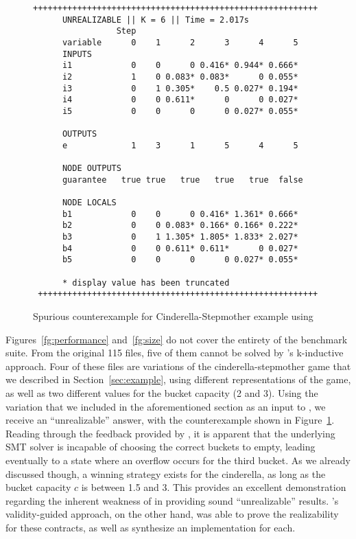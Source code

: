 \begin{figure}[h]
\centering
 \begin{Verbatim}[fontsize=\scriptsize]
 ++++++++++++++++++++++++++++++++++++++++++++++++++++++++++
      UNREALIZABLE || K = 6 || Time = 2.017s
                 Step
      variable      0    1      2      3      4      5
      INPUTS
      i1            0    0      0 0.416* 0.944* 0.666*
      i2            1    0 0.083* 0.083*      0 0.055*
      i3            0    1 0.305*    0.5 0.027* 0.194*
      i4            0    0 0.611*      0      0 0.027*
      i5            0    0      0      0 0.027* 0.055*
 
      OUTPUTS
      e             1    3      1      5      4      5
 
      NODE OUTPUTS
      guarantee   true true   true   true   true  false
 
      NODE LOCALS
      b1            0    0      0 0.416* 1.361* 0.666*
      b2            0    0 0.083* 0.166* 0.166* 0.222*
      b3            0    1 1.305* 1.805* 1.833* 2.027*
      b4            0    0 0.611* 0.611*      0 0.027*
      b5            0    0      0      0 0.027* 0.055*
      
      * display value has been truncated
 +++++++++++++++++++++++++++++++++++++++++++++++++++++++++
 \end{Verbatim}
\caption{Spurious counterexample for Cinderella-Stepmother example using \jsyn}

\label{fg:cex}
\end{figure}

Figures~\ref{fg:performance} and~\ref{fg:size} do not cover the entirety of the
benchmark suite. From the original 115 files, five of them cannot be
solved by \jsyn's k-inductive approach. Four of these files are variations of
the cinderella-stepmother game that we described in Section~\ref{sec:example}, using different representations of the game, as well as two different values
for the bucket capacity (2 and 3). Using the variation that we included in the
aforementioned section as an input to \jsyn, we receive an ``unrealizable'' answer, with the counterexample shown
in Figure~\ref{fg:cex}. Reading through the feedback provided by \jsyn, it is
apparent that the underlying SMT solver is incapable of choosing the correct
buckets to empty, leading eventually to a state where an overflow occurs for the
third bucket. As we already discussed though, a winning strategy exists for the
cinderella, as long as the bucket capacity $c$ is between 1.5 and 3. This
provides an excellent demonstration regarding the inherent weakness of \jsyn
in providing sound ``unrealizable'' results. \jsynvg's validity-guided approach,
on the other hand, was able to prove the realizability for these contracts, as
well as synthesize an implementation for each.

